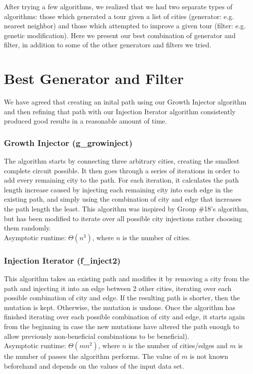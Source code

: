 \documentclass{article}
\begin{document}
After trying a few algorithms, we realized that we had two separate types of
algorithms: those which generated a tour given a list of cities (generator:
e.g. nearest neighbor) and those which attempted to improve a given tour
(filter: e.g. genetic modification). Here we present our best combination of
generator and filter, in addition to some of the other generators and
filters we tried.

\part*{Best Generator and Filter}

We have agreed that creating an inital path using our Growth Injector algorithm
and then refining that path with our Injection Iterator algorithm consistently
produced good results in a reasonable amount of time.

\section*{Growth Injector (g\_growinject)}

The algorithm starts by connecting three arbitrary cities, creating the
smallest complete circuit possible. It then goes through a series of iterations
in order to add every remaining city to the path. For each iteration, it
calculates the path length increase caused by injecting each remaining city
into each edge in the existing path, and simply using the combination of city
and edge that increases the path length the least. This algorithm was inspired
by Group \#18's algorithm, but has been modified to iterate over all possible
city injections rather choosing them randomly.\\Asymptotic runtime: $\Theta
(n^3)$, where $n$ is the number of cities.

\section*{Injection Iterator (f\_inject2)}

This algorithm takes an existing path and modifies it by removing a city from
the path and injecting it into an edge between 2 other cities, iterating over
each possible combination of city and edge. If the resulting path is shorter,
then the mutation is kept. Otherwise, the mutation is undone. Once the
algorithm has finished iterating over each possible combination of city and
edge, it starts again from the beginning in case the new mutations have altered
the path enough to allow previously non-beneficial combinations to be
beneficial).\\Asymptotic runtime: $\Theta (mn^2)$, where $n$ is the number of
cities/edges and $m$ is the number of passes the algorithm performs. The value
of $m$ is not known beforehand and depends on the values of the input data set.
\end{document}
